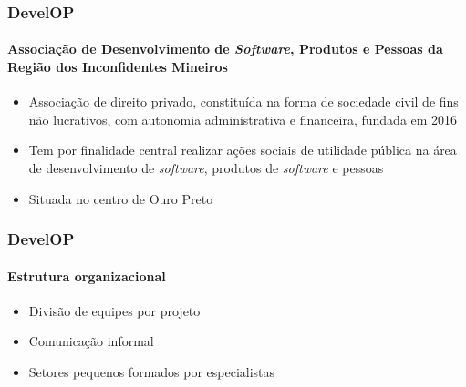 \documentclass[aspectratio=169]{beamer}
\begin{document}
\begin{frame}
	\frametitle{DevelOP}
	\framesubtitle{Associação de Desenvolvimento de \textit{Software}, Produtos e Pessoas da Região dos Inconfidentes Mineiros}
	
	\begin{itemize}
		
		 \item Associação de direito privado, constituída na forma de sociedade civil de fins não lucrativos, com autonomia administrativa e financeira, fundada em 2016
		 
		 \item Tem por finalidade central realizar ações sociais de utilidade pública na área de desenvolvimento de \textit{software}, produtos de \textit{software} e pessoas \cite{DevelOP:Estatuto}
		 
		 \item Situada no centro de Ouro Preto

	\end{itemize}

\end{frame}


\begin{frame}
	\frametitle{DevelOP}
	\framesubtitle{Estrutura organizacional}
	
	\begin{itemize}
		
		\item Divisão de equipes por projeto
		
		\item Comunicação informal
		
		\item Setores pequenos formados por especialistas
		
	\end{itemize}
	
\end{frame}

\end{document}
